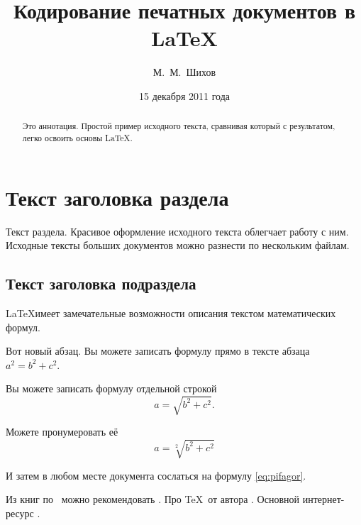\documentclass{article} %
\title{Кодирование печатных документов в \LaTeX} %
\author{М.~М.~Шихов} %
\date{15 декабря 2011 года} %
\begin{document}

\maketitle %

\begin{abstract} %
Это аннотация. Простой пример исходного текста, сравнивая 
который с результатом, легко освоить основы \LaTeX.
\end{abstract} %

\tableofcontents

\section{Текст заголовка раздела} %

Текст раздела. Красивое оформление исходного текста
облегчает работу с ним. Исходные тексты больших документов
можно разнести по нескольким файлам.


\subsection{Текст заголовка подраздела}
\LaTeX имеет замечательные возможности описания текстом математических формул.

Вот новый абзац. Вы можете записать формулу прямо в тексте абзаца $a^2=b^2+c^2$.

Вы можете записать формулу отдельной строкой \[a=\sqrt{ b^2+c^2}.\]

Можете пронумеровать её
\begin{equation}
\label{eq:pifagor} %
a=\sqrt[2]{ b^2+c^2}  %
\end{equation}

И затем в любом месте документа сослаться на формулу \ref{eq:pifagor}.

Из книг по \LaTeXe\ можно рекомендовать \cite{bib:cotelnikov,bib:baldin}. Про \TeX\ от автора \cite{bib:knuth:AllAbout}. Основной интернет-ресурс \cite{bib:ctan}.




\end{document}
